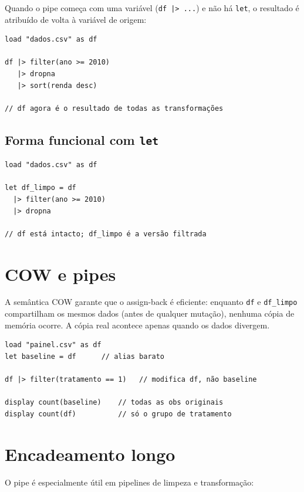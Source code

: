 Quando o pipe começa com uma variável (\lstinline{df |> ...}) e não há \lstinline{let},
o resultado é atribuído de volta à variável de origem:

\begin{lstlisting}[caption={Assign-back: df é modificado}]
load "dados.csv" as df

df |> filter(ano >= 2010)
   |> dropna
   |> sort(renda desc)

// df agora é o resultado de todas as transformações
\end{lstlisting}

\subsection*{Forma funcional com \texttt{let}}

\begin{lstlisting}[caption={let preserva o original}]
load "dados.csv" as df

let df_limpo = df
  |> filter(ano >= 2010)
  |> dropna

// df está intacto; df_limpo é a versão filtrada
\end{lstlisting}

\section{COW e pipes}

A semântica COW garante que o assign-back é eficiente: enquanto \lstinline{df} e
\lstinline{df_limpo} compartilham os mesmos dados (antes de qualquer mutação), nenhuma
cópia de memória ocorre. A cópia real acontece apenas quando os dados divergem.

\begin{lstlisting}[caption={Preservando baseline com let}]
load "painel.csv" as df
let baseline = df      // alias barato

df |> filter(tratamento == 1)   // modifica df, não baseline

display count(baseline)    // todas as obs originais
display count(df)          // só o grupo de tratamento
\end{lstlisting}

\section{Encadeamento longo}

O pipe é especialmente útil em pipelines de limpeza e transformação:

